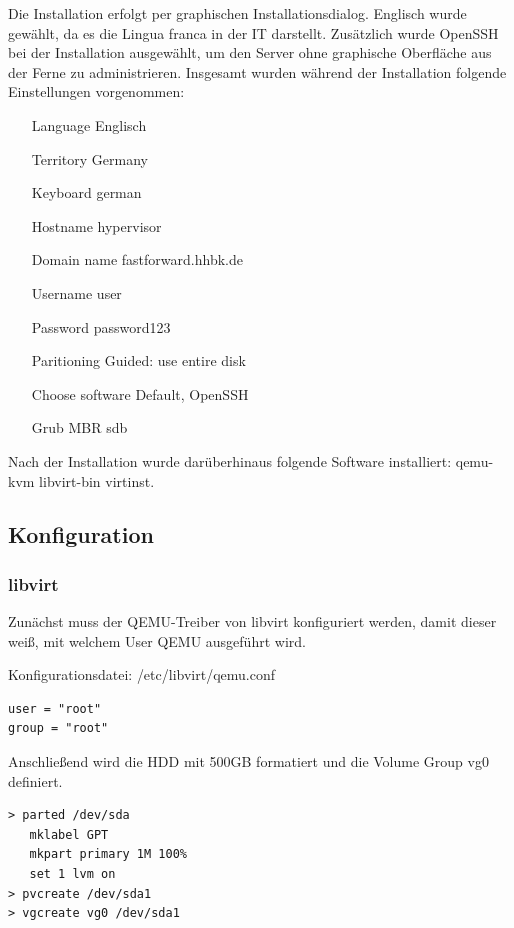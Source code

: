 Die Installation erfolgt per graphischen Installationsdialog. Englisch wurde gewählt, da es die Lingua franca in der IT darstellt. Zusätzlich wurde OpenSSH bei der Installation ausgewählt, um den Server ohne graphische Oberfläche aus der Ferne zu administrieren. Insgesamt wurden während der Installation folgende Einstellungen vorgenommen:
\begin{itemize}
	\item[Language] Englisch
	\item[Territory] Germany
	\item[Keyboard] german
	\item[Hostname] hypervisor
	\item[Domain name] fastforward.hhbk.de
	\item[Username] user
	\item[Password] password123
	\item[Paritioning] Guided: use entire disk
	\item[Choose software] Default, OpenSSH
	\item[Grub MBR] sdb
\end{itemize}

Nach der Installation wurde darüberhinaus folgende Software installiert: {\sc qemu-kvm libvirt-bin virtinst}.

\subsection{Konfiguration}

\subsubsection{libvirt}

Zunächst muss der QEMU-Treiber von {\sc libvirt} konfiguriert werden, damit dieser weiß, mit welchem User QEMU ausgeführt wird. 

Konfigurationsdatei: {\sc /etc/libvirt/qemu.conf}
\begin{lstlisting}
user = "root"
group = "root"
\end{lstlisting}

Anschließend wird die HDD mit 500GB formatiert und die Volume Group {\sc vg0} definiert.

\begin{lstlisting}[numbers=none]
> parted /dev/sda
   mklabel GPT
   mkpart primary 1M 100%
   set 1 lvm on
> pvcreate /dev/sda1
> vgcreate vg0 /dev/sda1
\end{lstlisting} 

